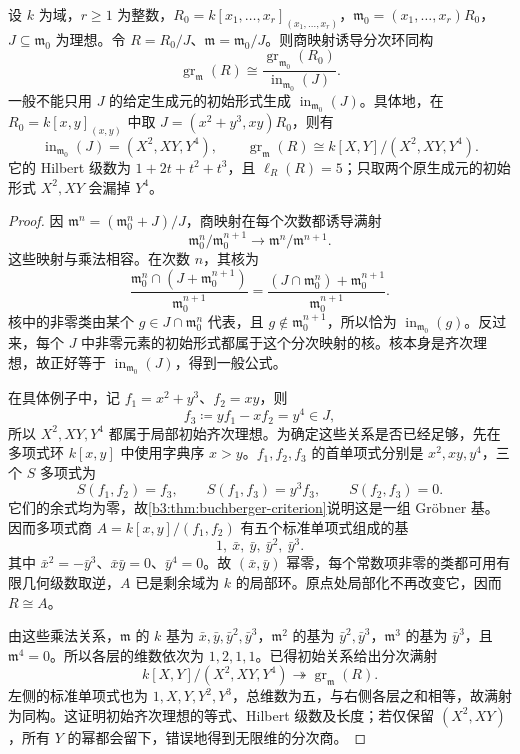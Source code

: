 \begin{proposition}\label{b3:prop:quotient-local-initial-ideal}
	设 \(k\) 为域，\(r\ge1\) 为整数，\(R_0=k[x_1,\ldots,x_r]_{(x_1,\ldots,x_r)}\)，\(\mathfrak m_0=(x_1,\ldots,x_r)R_0\)，\(J\subseteq\mathfrak m_0\) 为理想。令 \(R=R_0/J\)、\(\mathfrak m=\mathfrak m_0/J\)。则商映射诱导分次环同构
	\[
		\operatorname{gr}_{\mathfrak m}(R) \cong\dfrac{\operatorname{gr}_{\mathfrak m_0}(R_0)} {\operatorname{in}_{\mathfrak m_0}(J)}.
	\]
	一般不能只用 \(J\) 的给定生成元的初始形式生成 \(\operatorname{in}_{\mathfrak m_0}(J)\)。具体地，在 \(R_0=k[x,y]_{(x,y)}\) 中取 \(J=(x^2+y^3,xy)R_0\)，则有
	\[
		\operatorname{in}_{\mathfrak m_0}(J)=(X^2,XY,Y^4),\qquad \operatorname{gr}_{\mathfrak m}(R)\cong k[X,Y]/(X^2,XY,Y^4).
	\]
	它的 Hilbert 级数为 \(1+2t+t^2+t^3\)，且 \(\ell_R(R)=5\)；只取两个原生成元的初始形式 \(X^2,XY\) 会漏掉 \(Y^4\)。
\end{proposition}
\begin{proof}
	因 \(\mathfrak m^n=(\mathfrak m_0^n+J)/J\)，商映射在每个次数都诱导满射
	\[
		\mathfrak m_0^n/\mathfrak m_0^{n+1} \longrightarrow\mathfrak m^n/\mathfrak m^{n+1}.
	\]
	这些映射与乘法相容。在次数 \(n\)，其核为
	\[
		\dfrac{\mathfrak m_0^n\cap(J+\mathfrak m_0^{n+1})}{\mathfrak m_0^{n+1}} =\dfrac{(J\cap\mathfrak m_0^n)+\mathfrak m_0^{n+1}}{\mathfrak m_0^{n+1}}.
	\]
	核中的非零类由某个 \(g\in J\cap\mathfrak m_0^n\) 代表，且 \(g\notin\mathfrak m_0^{n+1}\)，所以恰为 \(\operatorname{in}_{\mathfrak m_0}(g)\)。反过来，每个 \(J\) 中非零元素的初始形式都属于这个分次映射的核。核本身是齐次理想，故正好等于 \(\operatorname{in}_{\mathfrak m_0}(J)\)，得到一般公式。

	在具体例子中，记 \(f_1=x^2+y^3\)、\(f_2=xy\)，则
	\[
		f_3\coloneqq yf_1-xf_2=y^4\in J,
	\]
	所以 \(X^2,XY,Y^4\) 都属于局部初始齐次理想。为确定这些关系是否已经足够，先在多项式环 \(k[x,y]\) 中使用字典序 \(x>y\)。\(f_1,f_2,f_3\) 的首单项式分别是 \(x^2,xy,y^4\)，三个 \(S\) 多项式为
	\[
		S(f_1,f_2)=f_3,\qquad S(f_1,f_3)=y^3f_3,\qquad S(f_2,f_3)=0.
	\]
	它们的余式均为零，故\cref{b3:thm:buchberger-criterion}说明这是一组 Gröbner 基。因而多项式商 \(A=k[x,y]/(f_1,f_2)\) 有五个标准单项式组成的基
	\[
		1,\ \bar x,\ \bar y,\ \bar y^2,\ \bar y^3.
	\]
	其中 \(\bar x^2=-\bar y^3\)、\(\bar x\bar y=0\)、\(\bar y^4=0\)。故 \((\bar x,\bar y)\) 幂零，每个常数项非零的类都可用有限几何级数取逆，\(A\) 已是剩余域为 \(k\) 的局部环。原点处局部化不再改变它，因而 \(R\cong A\)。

	由这些乘法关系，\(\mathfrak m\) 的 \(k\) 基为 \(\bar x,\bar y,\bar y^2,\bar y^3\)，\(\mathfrak m^2\) 的基为 \(\bar y^2,\bar y^3\)，\(\mathfrak m^3\) 的基为 \(\bar y^3\)，且 \(\mathfrak m^4=0\)。所以各层的维数依次为 \(1,2,1,1\)。已得初始关系给出分次满射
	\[
		k[X,Y]/(X^2,XY,Y^4)\twoheadrightarrow\operatorname{gr}_{\mathfrak m}(R).
	\]
	左侧的标准单项式也为 \(1,X,Y,Y^2,Y^3\)，总维数为五，与右侧各层之和相等，故满射为同构。这证明初始齐次理想的等式、Hilbert 级数及长度；若仅保留 \((X^2,XY)\)，所有 \(Y\) 的幂都会留下，错误地得到无限维的分次商。
\end{proof}

